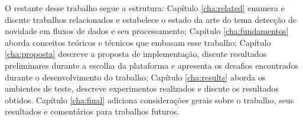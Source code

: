 O restante desse trabalho segue a estrutura:
Capítulo \ref{cha:related} enumera e discute trabalhos relacionados e estabelece
o estado da arte do tema detecção de novidade em fluxos de dados e seu
processamento;
Capítulo \ref{cha:fundamentos} aborda conceitos teóricos e técnicos que embasam
esse trabalho;
Capítulo \ref{cha:proposta} descreve a proposta de implementação, discute
resultados preliminares durante a escolha da plataforma e apresenta os desafios
encontrados durante o desenvolvimento do trabalho;
Capítulo \ref{cha:results} aborda os ambientes de teste, descreve experimentos
realizados e discute os resultados obtidos.
Capítulo \ref{cha:final} adiciona considerações gerais sobre o trabalho, seus
resultados e comentários para trabalhos futuros.


